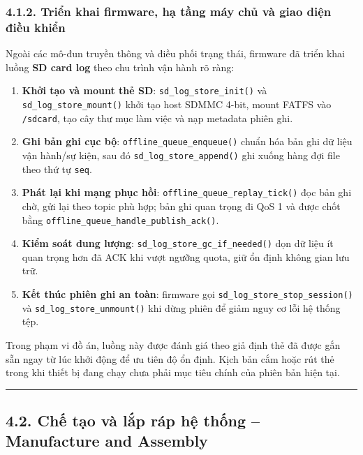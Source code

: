 \documentclass[a4paper]{extarticle}
\providecommand{\tightlist}{%
  \setlength{\itemsep}{0pt}\setlength{\parskip}{0pt}}
\begin{document}
\subsubsection{4.1.2. Triển khai firmware, hạ tầng máy chủ và giao diện điều
khiển}\label{412-triux1ec3n-khai-firmware-cloud-vuxe0-giao-diux1ec7n-ux111iux1ec1u-khiux1ec3n}

Ngoài các mô-đun truyền thông và điều phối trạng thái, firmware đã triển
khai luồng \textbf{SD card log} theo chu trình vận hành rõ ràng:

\begin{enumerate}
\def\labelenumi{\arabic{enumi}.}
\tightlist
\item
  \textbf{Khởi tạo và mount thẻ SD}: \texttt{sd\_log\_store\_init()} và
  \texttt{sd\_log\_store\_mount()} khởi tạo host SDMMC 4-bit, mount
  FATFS vào \texttt{/sdcard}, tạo cây thư mục làm việc và nạp metadata
  phiên ghi.
\item
  \textbf{Ghi bản ghi cục bộ}: \texttt{offline\_queue\_enqueue()} chuẩn
  hóa bản ghi dữ liệu vận hành/sự kiện, sau đó
  \texttt{sd\_log\_store\_append()} ghi xuống hàng đợi file theo thứ tự
  \texttt{seq}.
\item
  \textbf{Phát lại khi mạng phục hồi}:
  \texttt{offline\_queue\_replay\_tick()} đọc bản ghi chờ, gửi lại theo
  topic phù hợp; bản ghi quan trọng đi QoS 1 và được chốt bằng
  \texttt{offline\_queue\_handle\_publish\_ack()}.
\item
  \textbf{Kiểm soát dung lượng}:
  \texttt{sd\_log\_store\_gc\_if\_needed()} dọn dữ liệu ít quan trọng hơn đã
  ACK khi vượt ngưỡng quota, giữ ổn định không gian lưu trữ.
\item
  \textbf{Kết thúc phiên ghi an toàn}: firmware gọi
  \texttt{sd\_log\_store\_stop\_session()} và
  \texttt{sd\_log\_store\_unmount()} khi dừng phiên để giảm nguy cơ lỗi
  hệ thống tệp.
\end{enumerate}

Trong phạm vi đồ án, luồng này được đánh giá theo giả định thẻ đã được
gắn sẵn ngay từ lúc khởi động để ưu tiên độ ổn định. Kịch bản cắm hoặc
rút thẻ trong khi thiết bị đang chạy chưa phải mục tiêu chính của phiên
bản hiện tại.

\begin{center}\rule{0.5\linewidth}{0.5pt}\end{center}

\subsection{4.2. Chế tạo và lắp ráp hệ thống -- Manufacture and
Assembly}\label{42-chux1ebf-tux1ea1o-vuxe0-lux1eafp-ruxe1p-hux1ec7-thux1ed1ng--manufacture-and-assembly}
\end{document}
